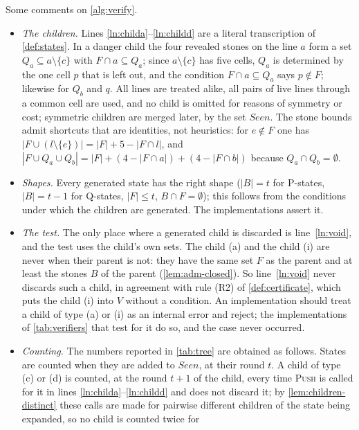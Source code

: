 Some comments on \cref{alg:verify}.

\begin{itemize}[leftmargin=1.6em]
\item \emph{The children.} Lines \ref{ln:childa}--\ref{ln:childd} are a literal transcription of
  \cref{def:states}. In a danger child the
  four revealed stones on the line $a$ form a set $Q_a\subseteq a\setminus\{c\}$ with $F\cap a\subseteq Q_a$;
  since $a\setminus\{c\}$ has five cells, $Q_a$ is determined by the one cell $p$ that is left out, and the
  condition $F\cap a\subseteq Q_a$ says $p\notin F$; likewise for $Q_b$ and $q$. All lines are treated alike, all pairs of live lines
  through a common cell are used, and no child is omitted for reasons of symmetry or cost; symmetric
  children are merged later, by the set $\mathit{Seen}$. The stone bounds admit shortcuts that are
  identities, not heuristics: for $e\notin F$ one has $|F\cup(l\setminus\{e\})|=|F|+5-|F\cap l|$, and
  $|F\cup Q_a\cup Q_b|=|F|+(4-|F\cap a|)+(4-|F\cap b|)$ because $Q_a\cap Q_b=\emptyset$.
\item \emph{Shapes.} Every generated state has the right shape ($|B|=t$ for P-states, $|B|=t-1$ for
  Q-states, $|F|\le t$, $B\cap F=\emptyset$); this follows from the conditions under which the children are
  generated. The implementations assert it.
\item \emph{The \VOID{} test.} The only place where a generated child is discarded is line~\ref{ln:void}, and the
  test uses the child's own sets. The child (a) and the child (i) are never \VOID{} when their
  parent is not: they have the same set $F$ as the parent and at least the stones $B$ of the parent
  (\cref{lem:adm-closed}). So line~\ref{ln:void} never discards such a child, in agreement with rule (R2)
  of \cref{def:certificate}, which puts the child (i) into $V$ without a condition. An implementation
  should treat a \VOID{} child of type (a) or (i) as an internal error and reject; the implementations of
  \cref{tab:verifiers} that test for it do so, and the case never occurred.
\item \emph{Counting.} The numbers reported in \cref{tab:tree} are obtained as follows. States are
  counted when they are added to $\mathit{Seen}$, at their round $t$. A child of type (c) or (d) is
  counted, at the round $t+1$ of the child, every time \textsc{Push} is called for it in lines
  \ref{ln:childa}--\ref{ln:childd} and does not discard it; by \cref{lem:children-distinct} these calls
  are made for pairwise different children of the state being expanded, so no child is counted twice for

\end{itemize}
